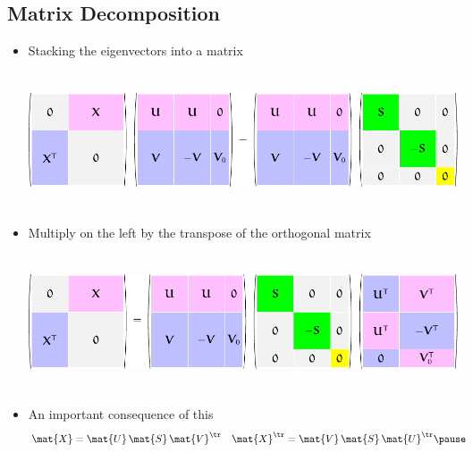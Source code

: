 \begin{slide}
\section[-2]{Matrix Decomposition}

\begin{PauseHighLight}
  \begin{itemize}
  \item Stacking the eigenvectors into a matrix
    \begin{center}
      \includegraphics[height=4cm]{svdContinued-0}\pause
    \end{center}
  \item Multiply on the left by the transpose of the orthogonal matrix
    \begin{center}
      \includegraphics[height=4cm]{svdContinued-1}\pause
    \end{center}
  \item An important consequence of this
    \begin{align*}
      \mat{X} &= \mat{U}\,\mat{S}\,\mat{V}^\tr &
      \mat{X}^\tr &= \mat{V}\,\mat{S}\,\mat{U}^\tr\pause
    \end{align*}

  \end{itemize}
\end{PauseHighLight}


\end{slide}



